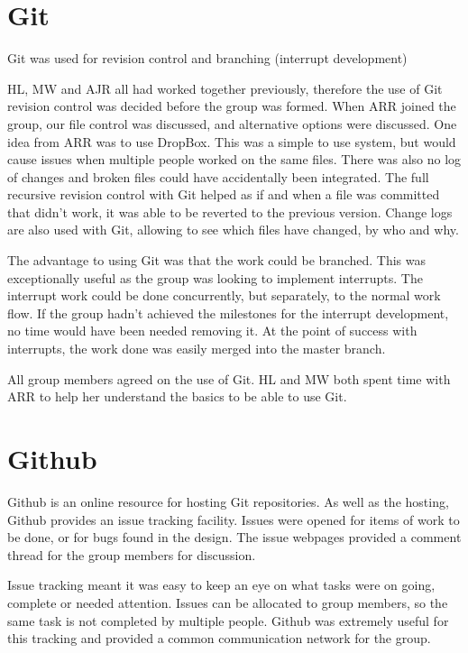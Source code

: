 

\section{Git}
Git was used for revision control and branching (interrupt development)

HL, MW and AJR all had worked together previously, therefore the use of Git revision control was decided before the group was formed. 
When ARR joined the group, our file control was discussed, and alternative options were discussed. 
One idea from ARR was to use DropBox. 
This was a simple to use system, but would cause issues when multiple people worked on the same files. 
There was also no log of changes and broken files could have accidentally been integrated. 
The full recursive revision control with Git helped as if and when a file was committed that didn't work, it was able to be reverted to the previous version.
Change logs are also used with Git, allowing to see which files have changed, by who and why. 


The advantage to using Git was that the work could be branched.
This was exceptionally useful as the group was looking to implement interrupts.
The interrupt work could be done concurrently, but separately, to the normal work flow. 
If the group hadn't achieved the milestones for the interrupt development, no time would have been needed removing it.
At the point of success with interrupts, the work done was easily merged into the master branch. 

All group members agreed on the use of Git. 
HL and MW both spent time with ARR to help her understand the basics to be able to use Git.


\section{Github}
Github is an online resource for hosting Git repositories. 
As well as the hosting, Github provides an issue tracking facility.
Issues were opened for items of work to be done, or for bugs found in the design.
The issue webpages provided a comment thread for the group members for discussion.

Issue tracking meant it was easy to keep an eye on what tasks were on going, complete or needed attention. 
Issues can be allocated to group members, so the same task is not completed by multiple people. 
Github was extremely useful for this tracking and provided a common communication network for the group. 


